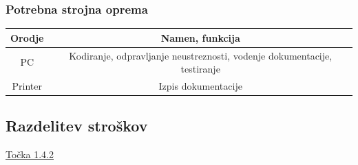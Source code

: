 \documentclass[a4paper,12pt]{article}
\begin{document}
		\subsubsection{Potrebna strojna oprema}
			\begin{center}
			\begin{tabular}{|c|c|}
					\hline
					\rowcolor{purple!30!} Orodje& Namen, funkcija\\
					\hline
					PC& Kodiranje, odpravljanje neustreznosti, vodenje dokumentacije, testiranje\\
					\hline
					Printer&Izpis dokumentacije\\
					\hline	
			\end{tabular}
			\end{center}


	\subsection{Razdelitev stroškov}
		\qquad \qquad \textcolor[HTML]{C50918}{\hyperlink{subsubsection.1.4.2}{Točka 1.4.2}}

\newpage
\end{document}
